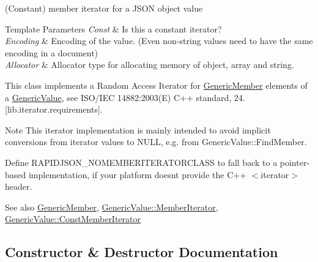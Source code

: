 (Constant) member iterator for a J\+S\+ON object value 


\begin{DoxyTemplParams}{Template Parameters}
{\em Const} & Is this a constant iterator? \\
\hline
{\em Encoding} & Encoding of the value. (Even non-\/string values need to have the same encoding in a document) \\
\hline
{\em Allocator} & Allocator type for allocating memory of object, array and string.\\
\hline
\end{DoxyTemplParams}
This class implements a Random Access Iterator for \hyperlink{struct_generic_member}{Generic\+Member} elements of a \hyperlink{class_generic_value}{Generic\+Value}, see I\+S\+O/\+I\+EC 14882\+:2003(E) C++ standard, 24. \mbox{[}lib.\+iterator.\+requirements\mbox{]}.

\begin{DoxyNote}{Note}
This iterator implementation is mainly intended to avoid implicit conversions from iterator values to {\ttfamily N\+U\+LL}, e.\+g. from Generic\+Value\+::\+Find\+Member.

Define {\ttfamily R\+A\+P\+I\+D\+J\+S\+O\+N\+\_\+\+N\+O\+M\+E\+M\+B\+E\+R\+I\+T\+E\+R\+A\+T\+O\+R\+C\+L\+A\+SS} to fall back to a pointer-\/based implementation, if your platform doesn\textquotesingle{}t provide the C++ $<$iterator$>$ header.
\end{DoxyNote}
\begin{DoxySeeAlso}{See also}
\hyperlink{struct_generic_member}{Generic\+Member}, \hyperlink{class_generic_value_a349b8faae61edc42b4289726820be439}{Generic\+Value\+::\+Member\+Iterator}, \hyperlink{class_generic_value_aac08c3e660a9036d3dcb8b10ff6c61f4}{Generic\+Value\+::\+Const\+Member\+Iterator} 
\end{DoxySeeAlso}


\subsection{Constructor \& Destructor Documentation}
\mbox{\label{class_generic_member_iterator_a2708717d497a0aadacdf75900de4c5b4}} 
